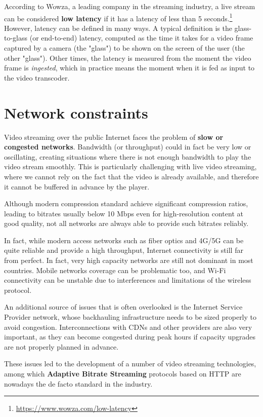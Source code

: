 According to Wowza, a leading company in the streaming industry, a live stream can be considered \textbf{low latency} if it has a latency of less than 5 seconds.\footnote{\url{https://www.wowza.com/low-latency}} However, latency can be defined in many ways. A typical definition is the glass-to-glass (or end-to-end) latency, computed as the time it takes for a video frame captured by a camera (the "glass") to be shown on the screen of the user (the other "glass"). Other times, the latency is measured from the moment the video frame is \textit{ingested}, which in practice means the moment when it is fed as input to the video transcoder.

\section{Network constraints}
\label{sec:intro/networks}

Video streaming over the public Internet faces the problem of \textbf{slow or congested networks}. Bandwidth (or throughput) could in fact be very low or oscillating, creating situations where there is not enough bandwidth to play the video stream smoothly. This is particularly challenging with live video streaming, where we cannot rely on the fact that the video is already available, and therefore it cannot be buffered in advance by the player.

Although modern compression standard achieve significant compression ratios, leading to bitrates usually below 10 Mbps even for high-resolution content at good quality, not all networks are always able to provide such bitrates reliably.

In fact, while modern access networks such as fiber optics and 4G/5G can be quite reliable and provide a high throughput, Internet connectivity is still far from perfect. In fact, very high capacity networks are still not dominant in most countries. Mobile networks coverage can be problematic too, and Wi-Fi connectivity can be unstable due to interferences and limitations of the wireless protocol.

An additional source of issues that is often overlooked is the Internet Service Provider network, whose backhauling infrastructure needs to be sized properly to avoid congestion. Interconnections with CDNs and other providers are also very important, as they can become congested during peak hours if capacity upgrades are not properly planned in advance.

These issues led to the development of a number of video streaming technologies, among which \textbf{Adaptive Bitrate Streaming} protocols based on HTTP are nowadays the de facto standard in the industry.\cite{bitmovin}

